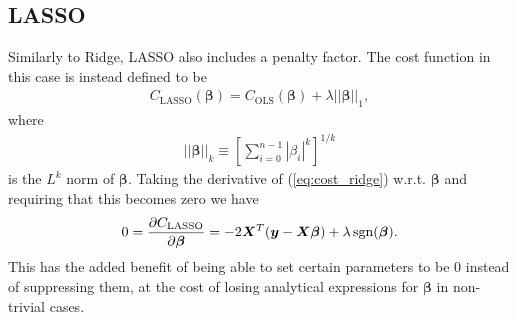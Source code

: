 \documentclass[%
reprint,
amsmath,amssymb,
aps,
pra,
]{revtex4-2}
\begin{document}
\subsection{LASSO}	\label{sec:THEORY_LASSO}
Similarly to Ridge, LASSO also includes a penalty factor. The cost function in this case is instead defined to be
\begin{align}
	C_\text{LASSO}(\bm\beta)=C_\text{OLS}(\bm\beta)+\lambda||\bm\beta||_1,
	\label{eq:cost_lasso}
\end{align}
where
\begin{align*}
	||\bm\beta||_k\equiv\left[\sum_{i=0}^{n-1}|\beta_i|^k\right]^{1/k}
\end{align*}
is the $L^k$ norm of $\bm\beta$. Taking the derivative of (\ref{eq:cost_ridge}) w.r.t. $\bm \beta$ and requiring that this becomes zero we have
\begin{align}
	0=\pdv{C_\text{LASSO}}{\bm\beta}=-2\bm X^T(\bm y-\bm X\bm\beta)+\lambda\,\text{sgn}(\bm\beta).
\end{align}
This has the added benefit of being able to set certain parameters to be $0$ instead of suppressing them, at the cost of losing analytical expressions for $\bm\beta$ in non-trivial cases.
\end{document}
